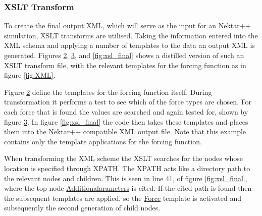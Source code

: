 \documentclass[11pt, a4paper]{report}
\begin{document}
\begin{figure}[htb!]
 \centering
 
 \label{fig:custom_type}
\end{figure}

\subsubsection{XSLT Transform}
To create the final output XML, which will serve as the input for an Nektar++ simulation, XSLT transforms are utilised. Taking the information entered into the XML schema and applying a number of templates to the data an output XML is generated. Figures \ref{fig:xsl_parent}, \ref{fig:xsl_child}, and \ref{fig:xsl_final} shows a distilled version of such an XSLT transform file, with the relevant templates for the forcing function as in figure \ref{fig:XML}.

\begin{figure}[htb!]
 \centering
 
 \label{fig:xsl_parent}
\end{figure}

Figure \ref{fig:xsl_parent} define the templates for the forcing function itself. During transformation it performs a test to see which of the force types are chosen. For each force that is found the values are searched and again tested for, shown by figure \ref{fig:xsl_child}. In figure \ref{fig:xsl_final} the code then takes these templates and places them into the Nektar++ compatible XML output file. Note that this example contains only the template applications for the forcing function.

\begin{figure}[htb!]
 \centering
 
 \label{fig:xsl_child}
\end{figure}

When transforming the XML scheme the XSLT searches for the nodes whose location is specified through XPATH. The XPATH acts like a directory path to the relevant nodes and children. This is seen in line 41, of figure \ref{fig:xsl_final}, where the top node \url{Additionalarameters} is cited. If the cited path is found then the subsequent templates are applied, so the \url{Force} template is activated and subsequently the second generation of child nodes.
\end{document}
